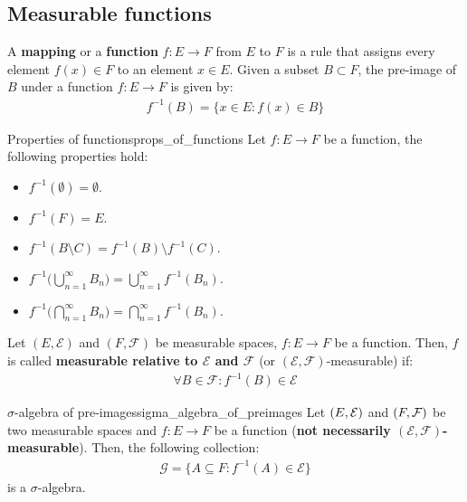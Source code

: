 \subsection{Measurable functions}
\begin{definition}
    A \textbf{mapping} or a \textbf{function} $f:E\to F$ from $E$ to $F$ is a rule that assigns every element $f(x) \in F$ to an element $x\in E$. Given a subset $B\subset F$, the pre-image of $B$ under a function $f:E\to F$ is given by:
    \begin{align*}
        f^{-1}(B) = \Big\{ x \in E : f(x) \in B \Big\}
    \end{align*}
\end{definition}

\begin{proposition}{Properties of functions}{props_of_functions}
    Let $f:E\to F$ be a function, the following properties hold:
    \begin{itemize}
        \item $f^{-1}(\emptyset)=\emptyset$.
        \item $f^{-1}(F)=E$.
        \item $f^{-1}(B\setminus C) = f^{-1}(B)\setminus f^{-1}(C)$.
        \item $f^{-1}\Bigg( \bigcup_{n=1}^\infty B_n \Bigg) = \bigcup_{n=1}^\infty f^{-1}(B_n)$.
        \item $f^{-1}\Bigg( \bigcap_{n=1}^\infty B_n \Bigg) = \bigcap_{n=1}^\infty f^{-1}(B_n)$.
    \end{itemize}
\end{proposition}

\begin{definition}
    Let $(E, \mathcal{E})$ and $(F, \mathcal{F})$ be measurable spaces, $f:E\to F$ be a function. Then, $f$ is called \textbf{measurable relative to $\mathcal{E}$ and $\mathcal{F}$} (or $(\mathcal{E}, \mathcal{F})$-measurable) if:
    \begin{align*}
        \forall B \in \mathcal{F} : f^{-1}(B) \in \mathcal{E}
    \end{align*}
\end{definition}

\begin{proposition}{$\sigma$-algebra of pre-images}{sigma_algebra_of_preimages}
    Let $(E, \mathcal{E})$ and $(F, \mathcal{F})$ be two measurable spaces and $f:E\to F$ be a function (\textbf{not necessarily $(\mathcal{E}, \mathcal{F})$-measurable}). Then, the following collection:
    \begin{align*}
        \mathcal{G} = \Big\{ 
            A \subseteq F : f^{-1}(A) \in \mathcal{E}
        \Big\}
    \end{align*}
    \noindent is a $\sigma$-algebra.
\end{proposition}

